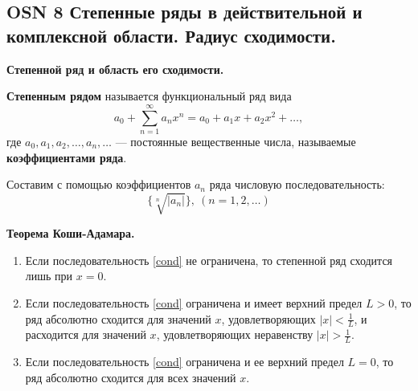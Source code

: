 \subsection*{OSN 8 Степенные ряды в действительной и комплексной области. Радиус сходимости.}

\textbf{Степенной ряд и область его сходимости.}

\textbf{Степенным рядом} называется функциональный ряд вида
$$ a_0 + \displaystyle\sum_{n=1}^{\infty}a_n x^n =a_0 +a_1 x+a_2 x^2 +\dots,$$
где $a_0, a_1, a_2,\dots, a_n,\dots$ --- постоянные вещественные числа, называемые \textbf{коэффициентами ряда}.

Составим с помощью коэффициентов $a_n$ ряда числовую последовательность:
\begin{equation}
    \{\sqrt[n]{|a_n|}\},~(n = 1,2,\dots)
    \label{cond}
\end{equation}

\textbf{Теорема Коши-Адамара.}
\begin{enumerate}
    \item Если последовательность \ref{cond} не ограничена, то степенной ряд сходится лишь при $x = 0$.
    \item Если последовательность \ref{cond} ограничена и имеет верхний предел $L > 0$, то ряд абсолютно сходится для значений $x$, удовлетворяющих $|x| < \frac{1}{L}$, и расходится для значений $x$, удовлетворяющих неравенству $|x| > \frac{1}{L}$.
    \item Если последовательность \ref{cond} ограничена и ее верхний предел $L = 0$, то ряд абсолютно сходится для всех значений $x$.
\end{enumerate}

